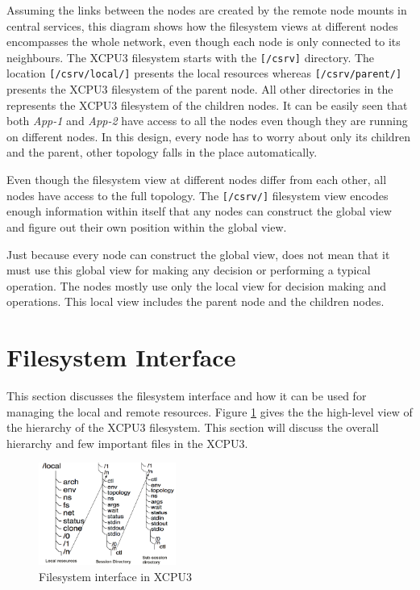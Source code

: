 Assuming the links between the nodes are created by the remote node mounts in
central services, this diagram shows how the filesystem views at different
nodes encompasses the whole network, even though each node is only connected to
its neighbours. The XCPU3 filesystem starts with the \texttt{[/csrv]}
directory. The location \texttt{[/csrv/local/]} presents the local resources
whereas \texttt{[/csrv/parent/]} presents the XCPU3 filesystem of the parent
node. All other directories in the represents the XCPU3 filesystem of the
children nodes.  It can be easily seen that both \textit{App-1} and
\textit{App-2} have access to all the nodes even though they are running on
different nodes.  In this design, every node has to worry about only its
children and the parent, other topology falls in the place automatically.

Even though the filesystem view at different nodes differ from each other, 
all nodes have access to the full topology.  The \texttt{[/csrv/]} filesystem
view encodes enough information within itself that any nodes can construct the
global view and figure out their own position within the global view.

Just because every node can construct the global view, does not mean that it
must use this global view for making any decision or performing a typical
operation. The nodes mostly use only the local view for decision making and
operations. This local view includes the parent node and the children nodes.


\section{Filesystem Interface}

This section discusses the filesystem interface and how it can be used for
managing the local and remote resources. Figure \ref{fig:xcpu3Local} gives the
the high-level view of the hierarchy of the XCPU3 filesystem.  This section
will discuss the overall hierarchy and few important files in the XCPU3.

\begin{figure}[h]
  \begin{center}
    \leavevmode
      \includegraphics[height=0.25\textheight,width=0.4\textwidth]
		{./img/local_session_subsessions}
    \caption{Filesystem interface in XCPU3}
    \label{fig:xcpu3Local}
  \end{center}
\end{figure}

